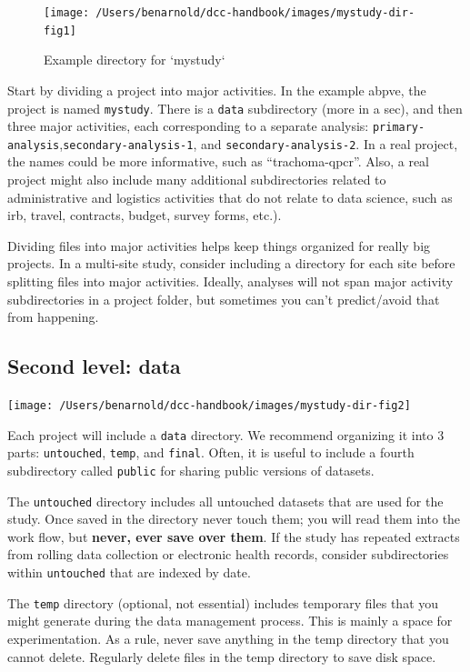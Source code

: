 \documentclass[]{book}
\begin{document}
\begin{figure}
\texttt{[image: /Users/benarnold/dcc-handbook/images/mystudy-dir-fig1]} \caption{Example directory for `mystudy`}\label{fig:dir-fig1}
\end{figure}

Start by dividing a project into major activities. In the example abpve, the project is named \texttt{mystudy}. There is a \texttt{data} subdirectory (more in a sec), and then three major activities, each corresponding to a separate analysis: \texttt{primary-analysis},\texttt{secondary-analysis-1}, and \texttt{secondary-analysis-2}. In a real project, the names could be more informative, such as ``trachoma-qpcr''. Also, a real project might also include many additional subdirectories related to administrative and logistics activities that do not relate to data science, such as irb, travel, contracts, budget, survey forms, etc.).

Dividing files into major activities helps keep things organized for really big projects. In a multi-site study, consider including a directory for each site before splitting files into major activities. Ideally, analyses will not span major activity subdirectories in a project folder, but sometimes you can't predict/avoid that from happening.

\hypertarget{second-level-data}{%
\subsection{Second level: data}\label{second-level-data}}

\texttt{[image: /Users/benarnold/dcc-handbook/images/mystudy-dir-fig2]}

Each project will include a \texttt{data} directory. We recommend organizing it into 3 parts: \texttt{untouched}, \texttt{temp}, and \texttt{final}. Often, it is useful to include a fourth subdirectory called \texttt{public} for sharing public versions of datasets.

The \texttt{untouched} directory includes all untouched datasets that are used for the study. Once saved in the directory never touch them; you will read them into the work flow, but \textbf{never, ever save over them}. If the study has repeated extracts from rolling data collection or electronic health records, consider subdirectories within \texttt{untouched} that are indexed by date.

The \texttt{temp} directory (optional, not essential) includes temporary files that you might generate during the data management process. This is mainly a space for experimentation. As a rule, never save anything in the temp directory that you cannot delete. Regularly delete files in the temp directory to save disk space.
\end{document}
